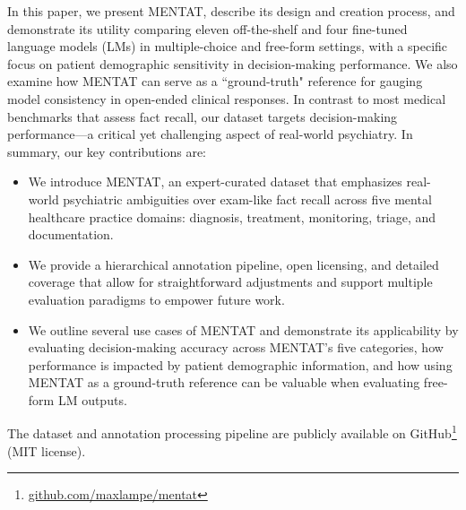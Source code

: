 In this paper, we present MENTAT, describe its design and creation process, and demonstrate its utility
comparing eleven off-the-shelf and four fine-tuned language models (LMs) in multiple-choice and free-form settings, with a specific focus on patient demographic sensitivity in decision-making performance. We also examine how MENTAT can serve as a ``ground-truth" reference for gauging model consistency in open-ended clinical responses. 
In contrast to most medical benchmarks that assess fact recall, our dataset targets decision-making performance—a critical yet challenging aspect of real-world psychiatry.
In summary, our key contributions are:

\begin{itemize}
    \item We introduce MENTAT, an expert-curated dataset that emphasizes real-world psychiatric ambiguities over exam-like fact recall across five mental healthcare practice domains: diagnosis, treatment, monitoring, triage, and documentation.
    \item We provide a hierarchical annotation pipeline, open licensing, and detailed coverage that allow for straightforward adjustments and support multiple evaluation paradigms to empower future work.
    \item We outline several use cases of MENTAT and demonstrate its applicability by evaluating decision-making accuracy across MENTAT’s five categories, how performance is impacted by patient demographic information, and how using MENTAT as a ground-truth reference can be valuable when evaluating free-form LM outputs.
\end{itemize}

The dataset and annotation processing pipeline are publicly available on GitHub\footnote{\href{https://github.com/maxlampe/mentat}{github.com/maxlampe/mentat}} (MIT license).